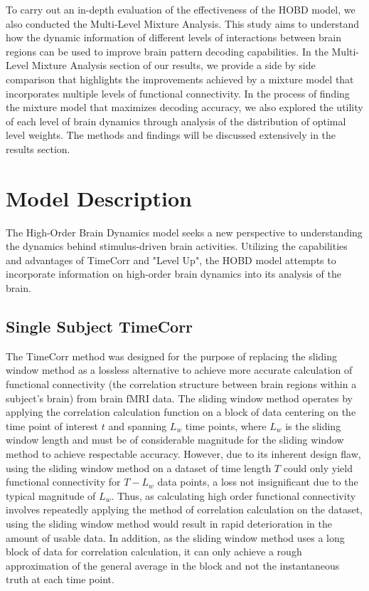 \documentclass[12pt]{article}
\begin{document}
To carry out an in-depth evaluation of the effectiveness of the HOBD model, we also conducted the Multi-Level Mixture Analysis. This study aims to understand how the dynamic information of different levels of interactions between brain regions can be used to improve brain pattern decoding capabilities. In the Multi-Level Mixture Analysis section of our results, we provide a side by side comparison that highlights the improvements achieved by a mixture model that incorporates multiple levels of functional connectivity. In the process of finding the mixture model that maximizes decoding accuracy, we also explored the utility of each level of brain dynamics through analysis of the distribution of optimal level weights. The methods and findings will be discussed extensively in the results section.

\section{Model Description}
The High-Order Brain Dynamics model seeks a new perspective to understanding the dynamics behind stimulus-driven brain activities. Utilizing the capabilities and advantages of TimeCorr and "Level Up", the HOBD model attempts to incorporate information on high-order brain dynamics into its analysis of the brain.

\subsection{Single Subject TimeCorr}
The TimeCorr method was designed for the purpose of replacing the sliding window method as a lossless alternative to achieve more accurate calculation of functional connectivity (the correlation structure between brain regions within a subject's brain) from brain fMRI data. The sliding window method operates by applying the correlation calculation function on a block of data centering on the time point of interest $t$ and spanning $L_w$ time points, where $L_w$ is the sliding window length and must be of considerable magnitude for the sliding window method to achieve respectable accuracy. However, due to its inherent design flaw, using the sliding window method on a dataset of time length $T$ could only yield functional connectivity for $T-L_w$ data points, a loss not insignificant due to the typical magnitude of $L_w$. Thus, as calculating high order functional connectivity involves repeatedly applying the method of correlation calculation on the dataset, using the sliding window method would result in rapid deterioration in the amount of usable data. In addition, as the sliding window method uses a long block of data for correlation calculation, it can only achieve a rough approximation of the general average in the block and not the instantaneous truth at each time point.
\end{document}
